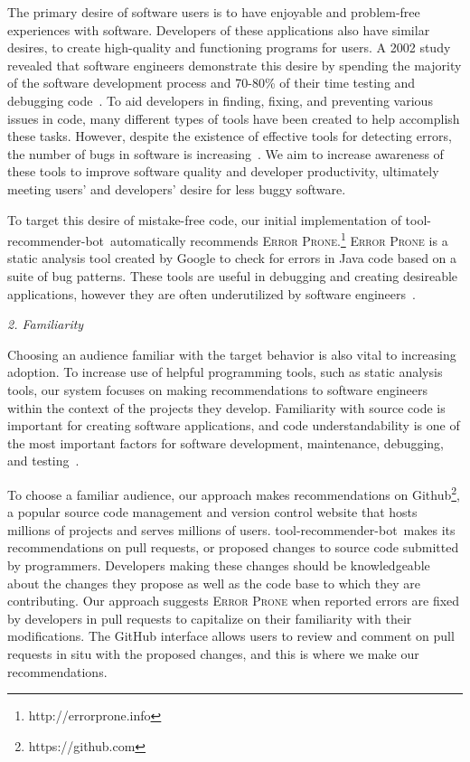 \documentclass[conference]{IEEEtran}
\newcommand{\tool}{tool-recommender-bot}
\newcommand{\pseudosubsection}[1]{\vspace{2mm} {\it #1}}
\begin{document}
The primary desire of software users is to have enjoyable and problem-free experiences with software. Developers of these applications also have similar desires, to create high-quality and functioning programs for users. A 2002 study revealed that software engineers demonstrate this desire by spending the majority of the software development process and 70-80\% of their time testing and debugging code~\cite{NIST}. To aid developers in finding, fixing, and preventing various issues in code, many different types of tools have been created to help accomplish these tasks. However, despite the existence of effective tools for detecting errors, the number of bugs in software is increasing~\cite{HaveThingsChanged}. We aim to increase awareness of these tools to improve software quality and developer productivity, ultimately meeting users' and developers' desire for less buggy software.

To target this desire of mistake-free code, our initial implementation of \tool~automatically recommends \textsc{Error Prone}.\footnote{http://errorprone.info} \textsc{Error Prone} is a static analysis tool created by Google to check for errors in Java code based on a suite of bug patterns. These tools are useful in debugging and creating desireable applications, however they are often underutilized by software engineers~\cite{Johnson2013Why}. 

\pseudosubsection{2. Familiarity}

Choosing an audience familiar with the target behavior is also vital to increasing adoption. To increase use of helpful programming tools, such as static analysis tools, our system focuses on making recommendations to software engineers within the context of the projects they develop. Familiarity with source code is important for creating software applications, and code understandability is one of the most important factors for software development, maintenance, debugging, and testing~\cite{Understandability}.

To choose a familiar audience, our approach makes recommendations on Github\footnote{https://github.com}, a popular source code management and version control website that hosts millions of projects and serves millions of users. \tool~makes its recommendations on pull requests, or proposed changes to source code submitted by programmers. Developers making these changes should be knowledgeable about the changes they propose as well as the code base to which they are contributing. Our approach suggests \textsc{Error Prone} when reported errors are fixed by developers in pull requests to capitalize on their familiarity with their modifications. The GitHub interface allows users to review and comment on pull requests in situ with the proposed changes, and this is where we make our recommendations.
\end{document}
